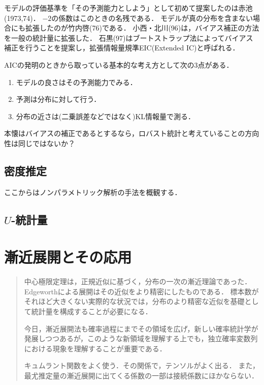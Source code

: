 \documentclass[uplatex,dvipdfmx]{jsreport}
\begin{document}
\begin{history}
    モデルの評価基準を「その予測能力としよう」として初めて提案したのは赤池(1973,74)．
    $-2$の係数はこのときの名残である．
    モデルが真の分布を含まない場合にも拡張したのが竹内啓(76)である．
    小西・北川(96)は，バイアス補正の方法を一般の統計量に拡張した．
    石黒(97)はブートストラップ法によってバイアス補正を行うことを提案し，拡張情報量規準EIC(Extended IC)と呼ばれる．
\end{history}

\begin{remark}
    AICの発明のときから取っている基本的な考え方として次の3点がある．
    \begin{enumerate}
        \item モデルの良さはその予測能力でみる．
        \item 予測は分布に対して行う．
        \item 分布の近さは(二乗誤差などではなく)KL情報量で測る．
    \end{enumerate}
\end{remark}

\begin{remarks}
    本懐はバイアスの補正であるとするなら，ロバスト統計と考えていることの方向性は同じではないか？
\end{remarks}

\section{密度推定}

\begin{tcolorbox}[colframe=ForestGreen, colback=ForestGreen!10!white,breakable,colbacktitle=ForestGreen!40!white,coltitle=black,fonttitle=\bfseries\sffamily,
title=]
    ここからはノンパラメトリック解析の手法を概観する．
\end{tcolorbox}

\section{$U$-統計量}

\chapter{漸近展開とその応用}

\begin{quotation}
    中心極限定理は，正規近似に基づく，分布の一次の漸近理論であった．
    Edgeworthによる展開はその近似をより精密にしたものである．
    標本数がそれほど大きくない実際的な状況では，分布のより精密な近似を基礎として統計量を構成することが必要になる．

    今日，漸近展開法も確率過程にまでその領域を広げ，新しい確率統計学が発展しつつあるが，このような新領域を理解する上でも，独立確率変数列における現象を理解することが重要である．

    キュムラント関数をよく使う．その関係で，テンソルがよく出る．
    また，最尤推定量の漸近展開に出てくる係数の一部は接続係数にほかならない．
\end{quotation}
\end{document}
